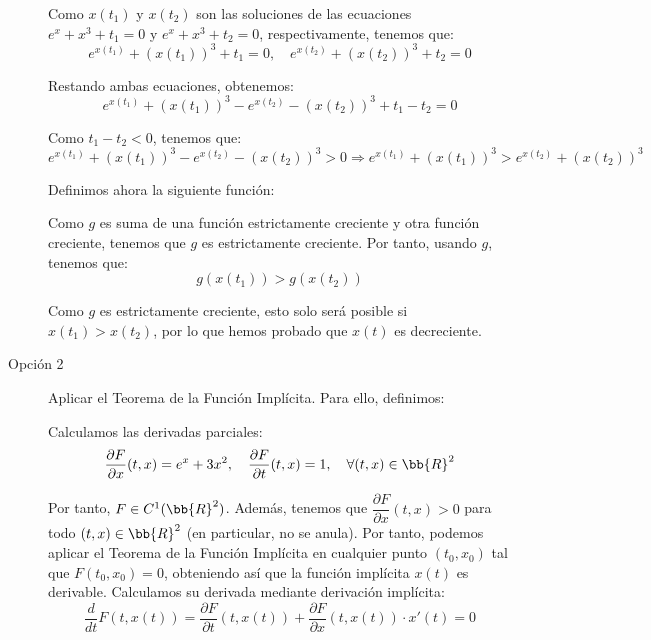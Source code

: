 \documentclass[12pt]{article}
\begin{document}
\begin{ejercicio}
\begin{description}
            Como $x(t_1)$ y $x(t_2)$ son las soluciones de las ecuaciones $e^x + x^3 + t_1 = 0$ y $e^x + x^3 + t_2 = 0$, respectivamente, tenemos que:
            \begin{equation*}
                e^{x(t_1)} + (x(t_1))^3 + t_1 = 0, \quad e^{x(t_2)} + (x(t_2))^3 + t_2 = 0
            \end{equation*}

            Restando ambas ecuaciones, obtenemos:
            \begin{equation*}
                e^{x(t_1)} + (x(t_1))^3 - e^{x(t_2)} - (x(t_2))^3 + t_1 - t_2 = 0
            \end{equation*}

            Como $t_1-t_2 < 0$, tenemos que:
            \begin{equation*}
                e^{x(t_1)} + (x(t_1))^3 - e^{x(t_2)} - (x(t_2))^3 > 0 \Longrightarrow
                e^{x(t_1)} + (x(t_1))^3 > e^{x(t_2)} + (x(t_2))^3
            \end{equation*}

            Definimos ahora la siguiente función:

            Como $g$ es suma de una función estrictamente creciente y otra función creciente, tenemos que $g$ es estrictamente creciente. Por tanto, usando $g$, tenemos que:
            \begin{equation*}
                g(x(t_1)) > g(x(t_2))
            \end{equation*}

            Como $g$ es estrictamente creciente, esto solo será posible si $x(t_1) > x(t_2)$, por lo que hemos probado que $x(t)$ es decreciente.

            \item[Opción 2] Aplicar el Teorema de la Función Implícita. Para ello, definimos:

            Calculamos las derivadas parciales:
            \begin{equation*}
                \dfrac{\partial F}{\partial x}(t,x) = e^x + 3x^2, \quad \dfrac{\partial F}{\partial t}(t,x) = 1, \quad \forall (t,x)\in\bb{R}^2
            \end{equation*}

            Por tanto, $F\in C^1(\bb{R}^2)$. Además, tenemos que $\dfrac{\partial F}{\partial x} (t, x) > 0$ para todo $(t, x)\in\bb{R}^2$ (en particular, no se anula). Por tanto, podemos aplicar el Teorema de la Función Implícita en cualquier punto $(t_0, x_0)$ tal que $F(t_0, x_0) = 0$,
            obteniendo así que la función implícita $x(t)$ es derivable. Calculamos su derivada mediante derivación implícita:
            \begin{equation*}
                \dfrac{d}{dt} F(t, x(t)) = \dfrac{\partial F}{\partial t}(t, x(t)) + \dfrac{\partial F}{\partial x}(t, x(t))\cdot x'(t) = 0
            \end{equation*}


\end{description}
\end{ejercicio}
\end{document}
